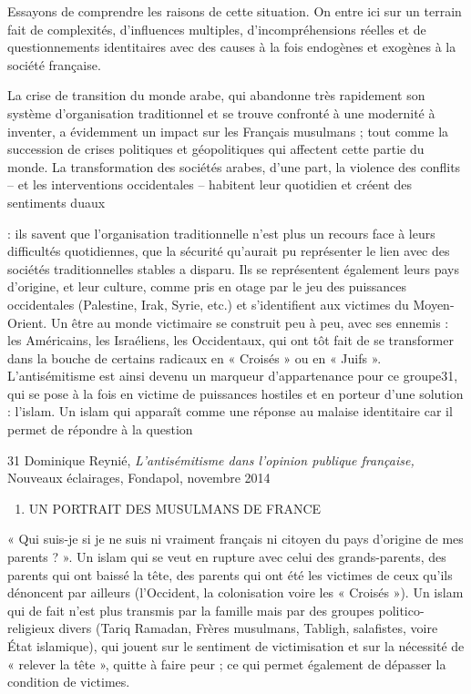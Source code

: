 Essayons de comprendre les raisons de cette situation. On entre ici sur
un terrain fait de complexités, d'influences multiples,
d'incompréhensions réelles et de questionnements identitaires avec des
causes à la fois endogènes et exogènes à la société française.

La crise de transition du monde arabe, qui abandonne très rapidement son
système d'organisation traditionnel et se trouve confronté à une
modernité à inventer, a évidemment un impact sur les Français musulmans
; tout comme la succession de crises politiques et géopolitiques qui
affectent cette partie du monde. La transformation des sociétés arabes,
d'une part, la violence des conflits -- et les interventions
occidentales -- habitent leur quotidien et créent des sentiments duaux

: ils savent que l'organisation traditionnelle n'est plus un recours
face à leurs difficultés quotidiennes, que la sécurité qu'aurait pu
représenter le lien avec des sociétés traditionnelles stables a disparu.
Ils se représentent également leurs pays d'origine, et leur culture,
comme pris en otage par le jeu des puissances occidentales (Palestine,
Irak, Syrie, etc.) et s'identifient aux victimes du Moyen-Orient. Un
être au monde victimaire se construit peu à peu, avec ses ennemis : les
Américains, les Israéliens, les Occidentaux, qui ont tôt fait de se
transformer dans la bouche de certains radicaux en « Croisés » ou en «
Juifs ». L'antisémitisme est ainsi devenu un marqueur d'appartenance
pour ce groupe31, qui se pose à la fois en victime de puissances
hostiles et en porteur d'une solution : l'islam. Un islam qui apparaît
comme une réponse au malaise identitaire car il permet de répondre à la
question

31 Dominique Reynié, \emph{L'antisémitisme dans l'opinion publique
française,} Nouveaux éclairages, Fondapol, novembre 2014


\begin{enumerate}
\def\labelenumi{\Roman{enumi}.}
\item
  UN PORTRAIT DES MUSULMANS DE FRANCE
\end{enumerate}


« Qui suis-je si je ne suis ni vraiment français ni citoyen du pays
d'origine de mes parents ? ». Un islam qui se veut en rupture avec celui
des grands-parents, des parents qui ont baissé la tête, des parents qui
ont été les victimes de ceux qu'ils dénoncent par ailleurs (l'Occident,
la colonisation voire les « Croisés »). Un islam qui de fait n'est plus
transmis par la famille mais par des groupes politico-religieux divers
(Tariq Ramadan, Frères musulmans, Tabligh, salafistes, voire État
islamique), qui jouent sur le sentiment de victimisation et sur la
nécessité de « relever la tête », quitte à faire peur ; ce qui permet
également de dépasser la condition de victimes.

